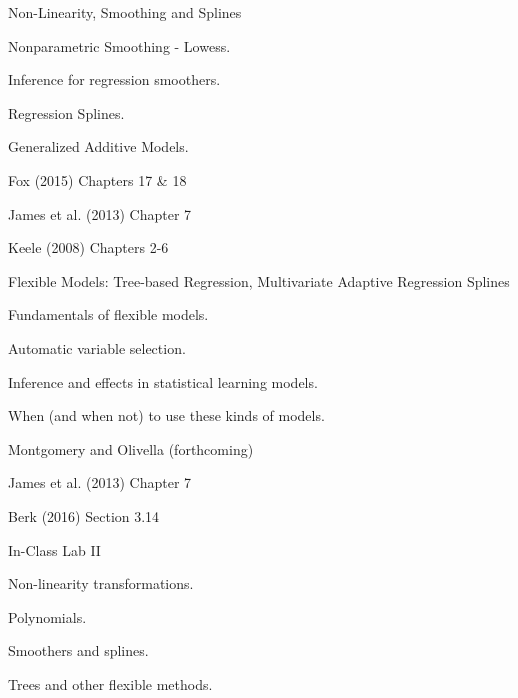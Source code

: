 \documentclass[letterpaper]{article}
\renewenvironment{itemize}{
  \begin{list}{}{
    \setlength{\leftmargin}{1.5em}
  }
}{
  \end{list}
}
\begin{document}
\begin{enumerate}
	\item Non-Linearity, Smoothing and Splines


			\begin{itemize}
				\item[$\square$] Nonparametric Smoothing - Lowess.
				\item[$\square$] Inference for regression smoothers.
				\item[$\square$] Regression Splines.
				\item[$\square$] Generalized Additive Models.
			\end{itemize}


			\begin{itemize}
				\item[$\star$] Fox (2015) Chapters 17 \& 18 
				\item[$\star$] James et al. (2013) Chapter 7 
				\item[-] Keele (2008) Chapters 2-6
			\end{itemize}



	\item Flexible Models: Tree-based Regression, Multivariate Adaptive Regression Splines



			\begin{itemize}
				\item[$\square$] Fundamentals of flexible models.
				\item[$\square$] Automatic variable selection.
				\item[$\square$] Inference and effects in statistical learning models.
				\item[$\square$] When (and when not) to use these kinds of models.
			\end{itemize}


			\begin{itemize}
				\item[$\star$] Montgomery and Olivella (forthcoming) 
				\item[$\star$] James et al. (2013) Chapter 7
				\item[$\star$] Berk (2016) Section 3.14
			\end{itemize}




	\item In-Class Lab II

			\begin{itemize}
				\item[$\square$] Non-linearity transformations.
				\item[$\square$] Polynomials.
				\item[$\square$] Smoothers and splines.
				\item[$\square$] Trees and other flexible methods.
			\end{itemize}




\end{enumerate}
\end{document}

